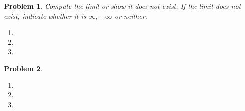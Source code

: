 \documentclass{article}
\renewcommand{\fcProblemRef}{\theproblem.\theenumi}
\newtheorem{problem}{Problem}
\begin{document}


\begin{problem}Compute the limit or show it does not exist. If the limit does not exist, indicate whether it is $\infty$, $-\infty$ or neither.
\begin{enumerate}[ref={\fcProblemRef}]
\item 
\item 
\item 
\end{enumerate}
\end{problem}




\begin{problem}
\begin{enumerate}[ref={\fcProblemRef}]
\item 
\item 
\item 

\end{enumerate}
\end{problem}


\end{document}
